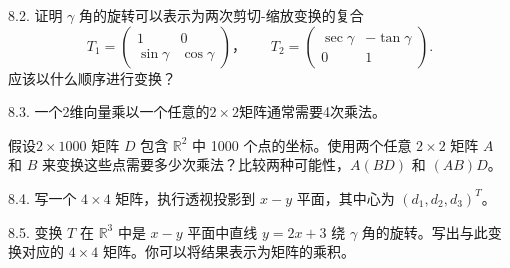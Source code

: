 8.2. 证明 $\gamma$ 角的旋转可以表示为两次剪切-缩放变换的复合 
$$T_1 = \begin{pmatrix} 1 & 0 \\ \sin \gamma & \cos \gamma \end{pmatrix} ，~~~~~~~~T_2 = \begin{pmatrix} \sec \gamma & -\tan \gamma \\ 0 & 1 \end{pmatrix}.$$
应该以什么顺序进行变换？

8.3. 一个2维向量乘以一个任意的$2\times 2$矩阵通常需要4次乘法。

假设$2 \times 1000$ 矩阵 $D$ 包含 $\mathbb{R}^2$ 中 1000 个点的坐标。使用两个任意 $2 \times 2$ 矩阵 $A$ 和 $B$ 来变换这些点需要多少次乘法？比较两种可能性，$A(BD)$ 和 $(AB)D$。

8.4. 写一个 $4 \times 4$ 矩阵，执行透视投影到 $x-y$ 平面，其中心为 $(d_1, d_2, d_3)^T$。

8.5. 变换 $T$ 在 $\mathbb{R}^3$ 中是 $x-y$ 平面中直线 $y = 2x+3$ 绕 $\gamma$ 角的旋转。写出与此变换对应的 $4 \times 4$ 矩阵。你可以将结果表示为矩阵的乘积。


